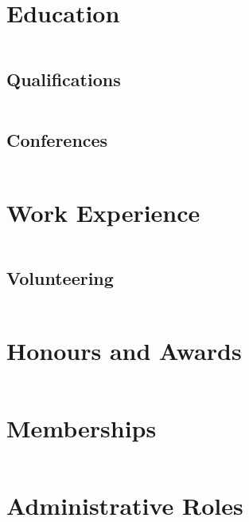 \documentclass[
    a4paper,
    oneside,
    10pt
]{article}
\newenvironment{timeline}{%
	\begin{longtable}{ c | c }%
}{%
	\end{longtable}%
}
\begin{document}
    \section{Education}
    \begin{timeline}
    		
    \end{timeline}
    
    \subsection{Qualifications}
    \begin{timeline}
    		
    \end{timeline}
    
    \subsection{Conferences}
    \begin{timeline}
    		
    \end{timeline}
    
    \section{Work Experience}
	\begin{timeline}
    		
    \end{timeline}
    
    \subsection{Volunteering}
	\begin{timeline}
    		
    \end{timeline}
    
	\section{Honours and Awards}
    \begin{timeline}
    		
    \end{timeline}
    
    \section{Memberships}
    \begin{timeline}
    		
    \end{timeline}
    
    \section{Administrative Roles}
    \begin{timeline}
    		
    \end{timeline}
    
    \pagebreak
    \tableofcontents
\end{document}
